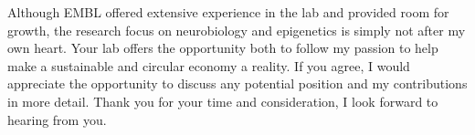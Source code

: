 \documentclass[11pt,a4paper,sans]{moderncv}
\begin{document}
\begin{spacing}{1.15}

Although EMBL offered extensive experience in the lab and provided room for growth, the research focus on neurobiology and epigenetics is simply not after my own heart.
Your lab offers the opportunity both to follow my passion to help make a sustainable and circular economy a reality. 
If you agree, I would appreciate the opportunity to discuss any potential position and my contributions in more detail. 
Thank you for your time and consideration, I look forward to hearing from you.


\end{spacing}
\end{document}
